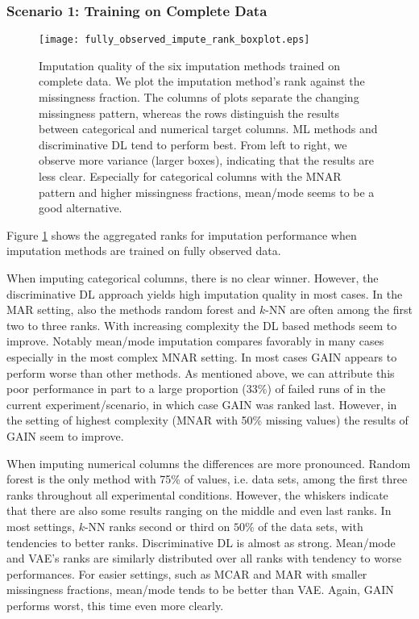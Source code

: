 \subsubsection{Scenario 1: Training on Complete Data}
\label{sec:results_experiment1_scenario1}

\begin{figure}\centering
    \texttt{[image: fully\_observed\_impute\_rank\_boxplot.eps]}
    \caption[Imputation Ranks - Fully Observed]{Imputation quality of the six imputation methods trained on complete data. We plot the imputation method's rank against the missingness fraction. The columns of plots separate the changing missingness pattern, whereas the rows distinguish the results between categorical and numerical target columns. ML methods and discriminative DL tend to perform best. From left to right, we observe more variance (larger boxes), indicating that the results are less clear. Especially for categorical columns with the MNAR pattern and higher missingness fractions, mean/mode seems to be a good alternative.
	}
	\label{fig:fully_observed_impute_rank_boxplot}
\end{figure}

Figure \ref{fig:fully_observed_impute_rank_boxplot} shows the aggregated ranks for imputation performance when imputation methods are trained on fully observed data.

When imputing categorical columns, there is no clear winner. However, the discriminative DL approach yields high imputation quality in most cases. In the MAR setting, also the methods random forest and $k$-NN are often among the first two to three ranks. With increasing complexity the DL based methods seem to improve. Notably mean/mode imputation compares favorably in many cases especially in the most complex MNAR setting. In most cases GAIN appears to perform worse than other methods. As mentioned above, we can attribute this poor performance in part to a large proportion (33\%) of failed runs of in the current experiment/scenario, in which case GAIN was ranked last. However, in the setting of highest complexity (MNAR with 50\% missing values) the results of GAIN seem to improve.

When imputing numerical columns the differences are more pronounced. Random forest is the only method with 75\% of values, i.e. data sets, among the first three ranks throughout all experimental conditions. However, the whiskers indicate that there are also some results ranging on the middle and even last ranks. In most settings, $k$-NN ranks second or third on $50\%$ of the data sets, with tendencies to better ranks. Discriminative DL is almost as strong. Mean/mode and VAE's ranks are similarly distributed over all ranks with tendency to worse performances. For easier settings, such as MCAR and MAR with smaller missingness fractions, mean/mode tends to be better than VAE. Again, GAIN performs worst, this time even more clearly.

